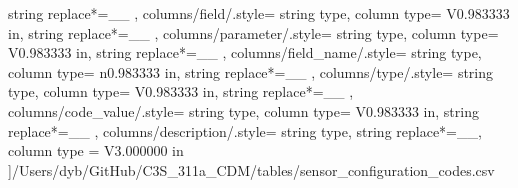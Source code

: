 \begin{landscape}
{            string replace*={_}{\_}
        },
    columns/field/.style={
            string type, 
            column type= V{0.983333 in}, 
            string replace*={_}{\_}
        },
    columns/parameter/.style={
            string type, 
            column type= V{0.983333 in}, 
            string replace*={_}{\_}
        },
    columns/field_name/.style={
            string type, 
            column type= n{0.983333 in}, 
            string replace*={_}{\_}
        },
    columns/type/.style={
            string type, 
            column type= V{0.983333 in}, 
            string replace*={_}{\_}
        },
    columns/code_value/.style={
            string type, 
            column type= V{0.983333 in}, 
            string replace*={_}{\_}
        },
    columns/description/.style={
            string type, 
            string replace*={_}{\_},
            column type = V{3.000000 in}
        }
    ]{/Users/dyb/GitHub/C3S_311a_CDM/tables/sensor_configuration_codes.csv}
\end{landscape}
